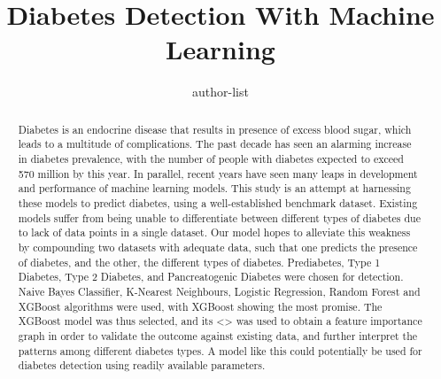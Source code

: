 \documentclass{article}
\title{Diabetes Detection With Machine Learning}
\author{author-list}
\begin{document}
\maketitle
\fontsize{10}{12}\selectfont

\begin{abstract}
Diabetes is an endocrine disease that results in presence of excess blood sugar, which leads to a multitude of complications. The past decade has seen an alarming increase in diabetes prevalence, with the number of people with diabetes expected to exceed 570 million by this year. 
In parallel, recent years have seen many leaps in development and performance of machine learning models. This study is an attempt at harnessing these models to predict diabetes, using a well-established benchmark dataset.
Existing models suffer from being unable to differentiate between different types of diabetes due to lack of data points in a single dataset. Our model hopes to alleviate this weakness by compounding two datasets with adequate data, such that one predicts the presence of diabetes, and the other, the different types of diabetes. Prediabetes, Type 1 Diabetes, Type 2 Diabetes, and Pancreatogenic Diabetes were chosen for detection.
Naive Bayes Classifier, K-Nearest Neighbours, Logistic Regression, Random Forest and XGBoost algorithms were used, with XGBoost showing the most promise.
The XGBoost model was thus selected, and its <> was used to obtain a feature importance graph in order to validate the outcome against existing data, and further interpret the patterns among different diabetes types.
A model like this could potentially be used for diabetes detection using readily available parameters.
\end{abstract}
\end{document}
